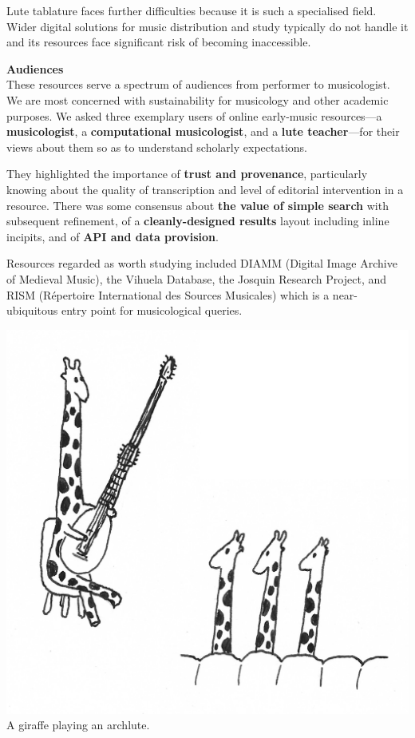 \documentclass[a0,landscape]{a0poster}
\begin{document}
\begin{multicols}{3}
\begin{sloppypar}
  \noindent Lute tablature faces further difficulties because it is
  such a specialised field. Wider digital solutions for music
  distribution and study typically do not handle it and its resources
  face significant risk of becoming inaccessible.

  \columnbreak
  \noindent\textbf{\LARGE Audiences}\\

  \noindent These resources serve a spectrum of audiences from
  performer to musicologist. We are most concerned with sustainability
  for musicology and other academic purposes. We asked three exemplary
  users of online early-music resources---a \textbf{musicologist}, a
  \textbf{computational musicologist}, and a \textbf{lute
    teacher}---for their views about them so as to understand
  scholarly expectations.

  \noindent They highlighted the importance of \textbf{trust and
    provenance}, particularly knowing about the quality of
  transcription and level of editorial intervention in a
  resource. There was some consensus about \textbf{the value of simple
    search} with subsequent refinement, of a \textbf{cleanly-designed
    results} layout including inline incipits, and of \textbf{API and
    data provision}.

  \noindent Resources regarded as worth studying included DIAMM
  (Digital Image Archive of Medieval Music), the Vihuela Database, the
  Josquin Research Project, and RISM (R\'epertoire International des
  Sources Musicales) which is a near-ubiquitous entry point for
  musicological queries.

  \begin{center}\vspace{1cm}
    \includegraphics[width=0.7\columnwidth]{images/giraffe-archlute-2}\\
    \vspace{-1cm}
  {\small A giraffe playing an archlute.}
    \vspace{1cm}
  \end{center}


\end{sloppypar}
\end{multicols}
\end{document}
